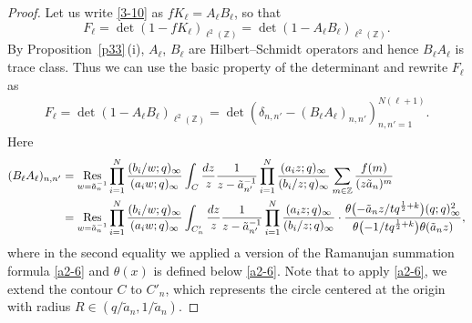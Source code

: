 \documentclass[11pt]{article}
\numberwithin{equation}{section}
\numberwithin{equation}{section}
\def\i{\infty}
\def\Z{\mathbb{Z}}
\begin{document}
 \begin{proof}
 Let us write \eqref{3-10} as $f K_{\ell} = A_{\ell} B_{\ell}$, so that
 \[
 F_{\ell}=\det(1-fK_{\ell})_{\ell^2(\Z)}=\det(1-A_{\ell}B_{\ell})_{\ell^2(\Z)}.
 \]
 By Proposition~\ref{p33}\,(i), $A_{\ell}$, $B_{\ell}$ are
 Hilbert--Schmidt operators and hence $B_{\ell}A_{\ell}$ is trace class.
 Thus we can use the basic property of the determinant \smash{$\det(1-A_{\ell}B_{\ell})_{\ell^2(\Z)}=\det(\delta_{i,j}-(B_{\ell}A_{\ell})_{i,j})_{i,j=1}^{N(\ell+1)}$}
 and rewrite $F_{\ell}$ as
 \begin{align}
 \label{3-17d}
 F_{\ell}=\det(1-A_{\ell}B_{\ell})_{\ell^2(\Z)}
 =\det(\delta_{n,n'}-(B_{\ell}A_{\ell})_{n,n'})_{n,n'=1}^{N(\ell+1)}.
 \end{align}
Here
\begin{align*}%
 (B_{\ell}A_{\ell})_{n,n'}
 &=
 \underset{w=\tilde{a}_n^{-1}}{\text{Res}}
 \prod_{i=1}^N\frac{(b_i/w;q)_{\i}}{(a_i w;q)_{\i}}
 \int_C\frac{{\rm d}z}{z}
 \frac{1}{z-\tilde{a}_{n'}^{-1}}
 \prod_{i=1}^N\frac{(a_i z;q)_{\i}}{(b_i/z;q)_{\i}}
 \sum_{m\in\Z}\frac{f(m)}{(z\tilde{a}_{n})^m}
 \\
 &=
 \underset{w=\tilde{a}_{n}^{-1}}{\text{Res}}
 \prod_{i=1}^N\frac{(b_i/w;q)_{\i}}{(a_i w;q)_{\i}}
 \int_{C_{n}'}\frac{{\rm d}z}{z}
 \frac{1}{z-\tilde{a}_{n'}^{-1}}
 \prod_{i=1}^N\frac{(a_i z;q)_{\i}}{(b_i/z;q)_{\i}}
 \cdot
 \frac{\theta\bigl(-\tilde{a}_{n}z/tq^{\frac12+k}\bigr)(q;q)_{\i}^2}{\theta\bigl(-1/tq^{\frac12+k}\bigr)\theta(\tilde{a}_n z)},
\end{align*}
 where in the second equality we applied a version of the Ramanujan summation formula \eqref{a2-6} and $\theta(x)$ is defined below \eqref{a2-6}. Note that to apply
 \eqref{a2-6}, we extend the contour $C$ to $C'_n$,
 which represents the circle centered at the origin with radius $R\in(q/\tilde{a}_n,1/\tilde{a}_n)$.


\end{proof}
\end{document}
